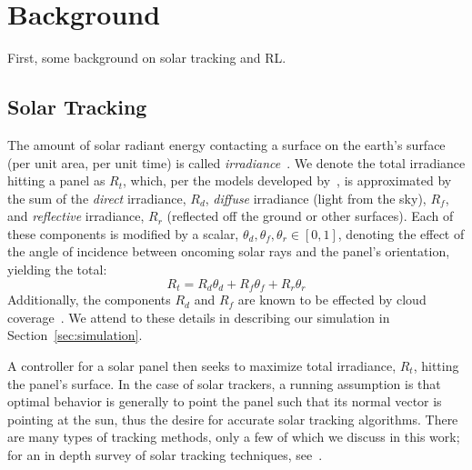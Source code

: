 \documentclass{article}
\begin{document}
\section{Background}

First, some background on solar tracking and RL.

\subsection{Solar Tracking}
The amount of solar radiant energy contacting a surface on the earth's surface (per unit area, per unit time) is called {\it irradiance}~\cite{goswami2000principles}.  We denote the total irradiance hitting a panel as $R_t$, which, per the models developed by~\citet{kamali2006estimating}, is approximated by the sum of the {\it direct} irradiance, $R_d$, {\it diffuse} irradiance (light from the sky), $R_f$, and {\it reflective} irradiance, $R_r$ (reflected off the ground or other surfaces). Each of these components is modified by a scalar, $\theta_d, \theta_f, \theta_r \in [0,1]$, denoting the effect of the angle of incidence between oncoming solar rays and the panel's orientation, yielding the total:
\begin{equation}
R_t = R_d \theta_d + R_f \theta_f + R_r \theta_r
\label{eq:total_rads}
\end{equation}
Additionally, the components $R_d$ and $R_f$ are known to be effected by cloud coverage~\cite{li2004overcast,pfister2003cloud,tzoumanikas2016effect}. We attend to these details in describing our simulation in Section~\ref{sec:simulation}.

A controller for a solar panel then seeks to maximize total irradiance, $R_t$, hitting the panel's surface. In the case of solar trackers, a running assumption is that optimal behavior is generally to point the panel such that its normal vector is pointing at the sun, thus the desire for accurate solar tracking algorithms. There are many types of tracking methods, only a few of which we discuss in this work; for an in depth survey of solar tracking techniques, see~\citet{mousazadeh2009review}.
\end{document}
